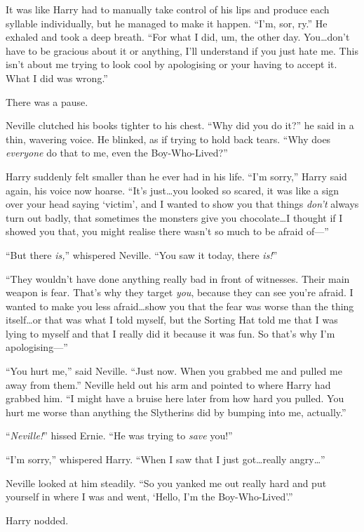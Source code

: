 It was like Harry had to manually take control of his lips and produce each syllable individually, but he managed to make it happen. “I’m, sor, ry.” He exhaled and took a deep breath. “For what I did, um, the other day. You…don’t have to be gracious about it or anything, I’ll understand if you just hate me. This isn’t about me trying to look cool by apologising or your having to accept it. What I did was wrong.”

There was a pause.

Neville clutched his books tighter to his chest. “Why did you do it?” he said in a thin, wavering voice. He blinked, as if trying to hold back tears. “Why does \emph{everyone} do that to me, even the Boy-Who-Lived?”

Harry suddenly felt smaller than he ever had in his life. “I’m sorry,” Harry said again, his voice now hoarse. “It’s just…you looked so scared, it was like a sign over your head saying ‘victim’, and I wanted to show you that things \emph{don’t} always turn out badly, that sometimes the monsters give you chocolate…I thought if I showed you that, you might realise there wasn’t so much to be afraid of—”

“But there \emph{is,}” whispered Neville. “You saw it today, there \emph{is!}”

“They wouldn’t have done anything really bad in front of witnesses. Their main weapon is fear. That’s why they target \emph{you}, because they can see you’re afraid. I wanted to make you less afraid…show you that the fear was worse than the thing itself…or that was what I told myself, but the Sorting Hat told me that I was lying to myself and that I really did it because it was fun. So that’s why I’m apologising—”

“You hurt me,” said Neville. “Just now. When you grabbed me and pulled me away from them.” Neville held out his arm and pointed to where Harry had grabbed him. “I might have a bruise here later from how hard you pulled. You hurt me worse than anything the Slytherins did by bumping into me, actually.”

“\emph{Neville!}” hissed Ernie. “He was trying to \emph{save} you!”

“I’m sorry,” whispered Harry. “When I saw that I just got…really angry…”

Neville looked at him steadily. “So you yanked me out really hard and put yourself in where I was and went, ‘Hello, I’m the Boy-Who-Lived’.”

Harry nodded.


